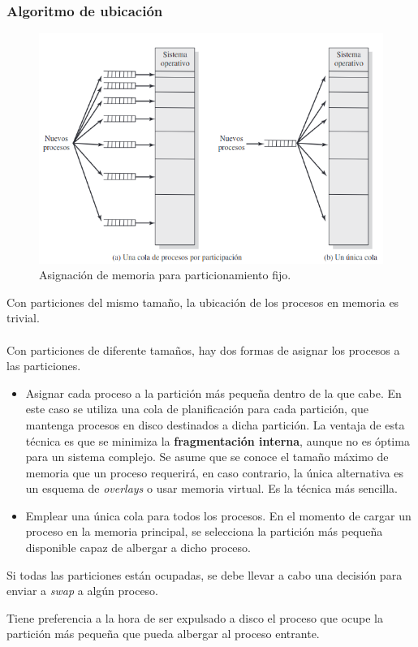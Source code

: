 \documentclass[12pt, a4paper]{article}
\begin{document}
\subsubsection{Algoritmo de ubicación}
\begin{figure}[H]
    \centering
    \includegraphics[width=12cm]{particionfija2.png}\par
    \caption{Asignación de memoria para particionamiento fijo.}
\end{figure}
Con particiones del mismo tamaño, la ubicación de los procesos en memoria es trivial.\\\\ 
Con particiones de diferente tamaños, hay dos formas de asignar los procesos a las particiones. \\ 
\begin{itemize}
    \item Asignar cada proceso a la partición más pequeña dentro de la que cabe. En este caso se utiliza una cola de planificación para cada partición, que mantenga procesos en disco destinados a dicha partición. La ventaja de esta técnica es que se minimiza la \textbf{fragmentación interna}, aunque no es óptima para un sistema complejo. Se asume que se conoce el tamaño máximo de memoria que un proceso requerirá, en caso contrario, la única alternativa es un esquema de \textit{overlays} o usar memoria virtual. Es la técnica más sencilla.
    \item Emplear una única cola para todos los procesos. En el momento de cargar un proceso en la memoria principal, se selecciona la partición más pequeña disponible capaz de albergar a dicho proceso.
\end{itemize}
Si todas las particiones están ocupadas, se debe llevar a cabo una decisión para enviar a \textit{swap} a algún proceso.
\begin{tcolorbox}[colback=cyan!10, colframe=blue!70, title=Nota]
    Tiene preferencia a la hora de ser expulsado a disco el proceso que ocupe la partición más pequeña que pueda albergar al proceso entrante.
\end{tcolorbox}
\end{document}

